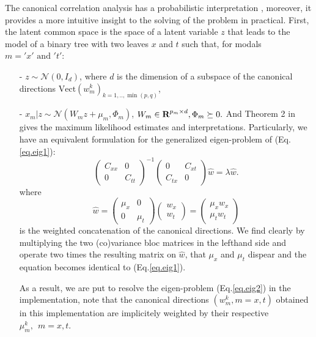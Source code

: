 \documentclass[12pt]{report}	%
\begin{document}
The canonical correlation analysis has a probabilistic interpretation \citep{cca2}, moreover, it provides a more intuitive insight to the solving of the problem in practical. First, the latent common space is the space of a latent variable $z$ that leads to the model of a binary tree with two leaves $x$ and $t$ such that, for modals $m =  'x' \text{ and } 't'$:  \begin{itemize}

\item[-] $z \sim \mathcal{N}(0, I_d)$, where $d$ is the dimension of a subspace of the canonical directions $\text{Vect}(w_{m}^k)_{k=1,..,\min(p,q)}$, 
\item[-] $x_m \vert z \sim \mathcal{N}(W_m z + \mu_m, \Phi_m)$, $W_m\in {\mbox{\bf R}}^{p_m\times d}, \Phi_m \succeq 0.$  And Theorem 2 in \citep{cca2} gives the maximum likelihood estimates and interpretations.
Particularly, we have an equivalent formulation for the generalized eigen-problem of (Eq.\ref{eq.eig1}):
\begin{equation}
\begin{pmatrix}
  C_{xx} & 0 \\
  0 & C_{tt}
 \end{pmatrix}^{-1} \begin{pmatrix}
  0 & C_{xt} \\
  C_{tx} & 0
 \end{pmatrix} \hat{w} = \lambda\hat{w}.
 \label{eq.eig2}
\end{equation} where $$\hat{w} = \begin{pmatrix}
  \mu_{x} & 0 \\
  0 & \mu_{t}
 \end{pmatrix}\begin{pmatrix}
   w_x \\
   w_t
 \end{pmatrix} = \begin{pmatrix}
  \mu_x w_x \\
  \mu_t w_t
 \end{pmatrix}$$ is the weighted concatenation of the canonical directions. We find clearly by multiplying the two (co)variance bloc matrices in the lefthand side and operate two times the resulting matrix on $\hat{w}$, that $\mu_x$ and $\mu_t$ dispear and the equation becomes identical to (Eq.\ref{eq.eig1}).
 
As a result, we are put to resolve the eigen-problem
(Eq.\ref{eq.eig2}) in the implementation, note that the canonical directions $(w_m^k, m = x, t)$ obtained in this implementation are implicitely weighted by their respective $\mu_m^k, \ \ m = x, t$.
\end{itemize}
\end{document}
